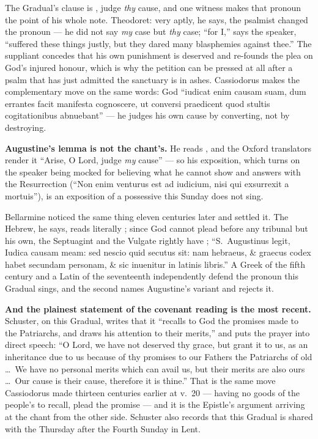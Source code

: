 \begin{witnessnote}
The Gradual's clause is , judge \emph{thy}
cause, and one witness makes that pronoun the point of his whole note.
Theodoret: very aptly, he says, the psalmist changed the pronoun --- he did not
say \textit{my} case but \textit{thy} case; ``for I,'' says the speaker,
``suffered these things justly, but they dared many blasphemies against
thee.'' The suppliant concedes that his own punishment is deserved and
re-founds the plea on God's injured honour, which is why the petition can be
pressed at all after a psalm that has just admitted the sanctuary is in ashes.
Cassiodorus makes the complementary move on the same words: God ``iudicat enim
causam suam, dum errantes facit manifesta cognoscere, ut conversi praedicent
quod stultis cogitationibus abnuebant'' --- he judges his own cause by
converting, not by destroying.

\textbf{Augustine's lemma is not the chant's.} He
reads , and the Oxford
translators render it ``Arise, O Lord, judge \textit{my} cause'' --- so his
exposition, which turns on the speaker being mocked for believing what he
cannot show and answers with the Resurrection (``Non enim venturus est ad
iudicium, nisi qui exsurrexit a mortuis''), is an exposition of a possessive
this Sunday does not sing.

Bellarmine noticed the same thing eleven centuries later and settled it. The
Hebrew, he says, reads literally ; since God cannot
plead before any tribunal but his own, the Septuagint and the Vulgate rightly
have ; ``S.\ Augustinus legit, Iudica causam meam:
sed nescio quid secutus sit: nam hebraeus, \& graecus codex habet secundam
personam, \& sic inuenitur in latinis libris.'' A Greek of the fifth century
and a Latin of the seventeenth independently defend the pronoun this Gradual
sings, and the second names Augustine's variant and rejects it.
\end{witnessnote}

\textbf{And the plainest statement of the covenant reading is the most
recent.} Schuster, on this Gradual, writes that it ``recalls to God the
promises made to the Patriarchs, and draws his attention to their merits,''
and puts the prayer into direct speech: ``O Lord, we have not deserved thy
grace, but grant it to us, as an inheritance due to us because of thy promises
to our Fathers the Patriarchs of old \dots\ We have no personal merits which
can avail us, but their merits are also ours \dots\ Our cause is their cause,
therefore it is thine.'' That is the same move Cassiodorus made thirteen
centuries earlier at v.~20 --- having no goods of the people's to recall, plead
the promise --- and it is the Epistle's argument arriving at the chant from the
other side. Schuster also records that this Gradual is shared with the Thursday
after the Fourth Sunday in Lent.

